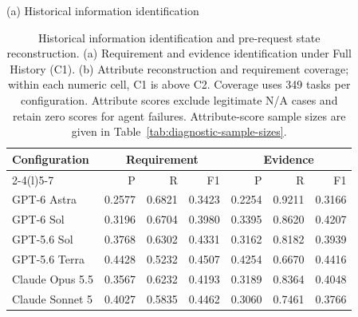 \documentclass{article} %
\begin{document}
\begin{table}[t]
\caption{Historical information identification and pre-request state reconstruction. (a) Requirement and evidence identification under Full History (C1). (b) Attribute reconstruction and requirement coverage; within each numeric cell, C1 is above C2. Coverage uses 349 tasks per configuration. Attribute scores exclude legitimate N/A cases and retain zero scores for agent failures. Attribute-score sample sizes are given in Table~\ref{tab:diagnostic-sample-sizes}.}
\label{tab:diagnostic-results-app}
\centering\normalsize
\setlength{\tabcolsep}{1.2pt}
\edef\diagrowheight{\the\dimexpr2\baselineskip\relax}
\edef\diagrowdepth{\the\dimexpr0.8\baselineskip\relax}
\newcommand{\diagrowstrut}{\rule[-\diagrowdepth]{0pt}{\diagrowheight}}
\newcommand{\diagpair}[2]{{\renewcommand{\arraystretch}{1}\begin{tabular}[c]{@{}r@{}}#1\\#2\end{tabular}}}
\begin{minipage}[t]{\linewidth}
\vspace{0pt}
\centering
(a) Historical information identification\par\smallskip
\begin{tabular*}{\linewidth}{@{\extracolsep{\fill}}lrrrrrr@{}}
\toprule
\multirow{2}{*}{Configuration} & \multicolumn{3}{c}{Requirement} & \multicolumn{3}{c}{Evidence} \\
\cmidrule(lr){2-4}\cmidrule(l){5-7}
 & P & R & F1 & P & R & F1 \\
\midrule
\diagrowstrut GPT-6 Astra & 0.2577 & 0.6821 & 0.3423 & 0.2254 & 0.9211 & 0.3166 \\
\diagrowstrut GPT-6 Sol & 0.3196 & 0.6704 & 0.3980 & 0.3395 & 0.8620 & 0.4207 \\
\diagrowstrut GPT-5.6 Sol & 0.3768 & 0.6302 & 0.4331 & 0.3162 & 0.8182 & 0.3939 \\
\diagrowstrut GPT-5.6 Terra & 0.4428 & 0.5232 & 0.4507 & 0.4254 & 0.6670 & 0.4416 \\
\diagrowstrut Claude Opus 5.5 & 0.3567 & 0.6232 & 0.4193 & 0.3189 & 0.8364 & 0.4048 \\
\diagrowstrut Claude Sonnet 5 & 0.4027 & 0.5835 & 0.4462 & 0.3060 & 0.7461 & 0.3766 \\
\bottomrule
\end{tabular*}
\end{minipage}\par\medskip
\begin{minipage}[t]{\linewidth}

\end{minipage}
\end{table}
\end{document}
